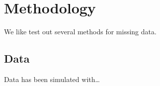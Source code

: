 \chapter{Methodology}

We like test out several methods for missing data.~\cite{Senarathne2020}

\section{Data}

Data has been simulated with\dots